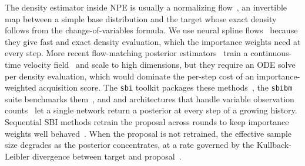 The density estimator inside NPE is usually a normalizing
flow~\citep{papamakarios2021normalizing}, an invertible map between a simple base distribution and the target whose exact density follows from the change-of-variables formula. We use neural spline flows~\citep{durkan2019neural} because they give fast and exact density evaluation, which the importance weights need at every step. More recent
flow-matching posterior estimators~\citep{lipman2023flow,wildberger2024flow,carrasco2026pawsterior}
train a continuous-time velocity field~\citep{chen2018neural} and scale to high dimensions, but they require an ODE solve per density evaluation, which would dominate the per-step cost of an importance-weighted acquisition score. The \texttt{sbi} toolkit packages these methods~\citep{tejerocantero2020sbi}, the \texttt{sbibm} suite benchmarks
them~\citep{lueckmann2021benchmarking}, and and architectures that handle variable observation counts~\citep{gloeckler2024all} let a single network return a posterior at every step of a growing history. Sequential SBI methods retrain the proposal across rounds to keep importance weights well behaved~\citep{deistler2022truncated}. When the proposal is not retrained, the effective sample size degrades as the posterior concentrates, at a rate governed by the Kullback-Leibler divergence between target and proposal~\citep{chatterjee2018sample}.



